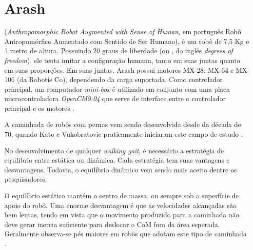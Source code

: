 \chapter{Arash}

(\textit{Anthropomorphic Robot Augmented with Sense of Human}, em português Robô Antropomórfico Aumentado com Sentido de Ser Humano), é um robô de 7,5 Kg e 1 metro de altura. Possuindo 20 graus de liberdade (ou , do inglês \textit{degrees of freedom}), ele tenta imitar a configuração humana, tanto em suas juntas quanto em suas proporções. Em suas juntas, Arash possui motores MX-28, MX-64 e MX-106 (da Robotis Co), dependendo da carga suportada. Como controlador principal, um computador \textit{mini-box} é utilizado em conjunto com uma placa microcontroladora \textit{OpenCM9.04} que serve de interface entre o controlador principal e os motores \cite{autdp2016}.

\noindent\makebox[\linewidth]{\rule{\paperwidth}{0.4pt}}

\begin{draft}
	A caminhada de robôs com pernas vem sendo desenvolvida desde da década de 70, quando Kato e Vukobratovic praticamente iniciaram este campo de estudo \cite{kajita2008}.
\end{draft}

\begin{draft}
	No desenvolvimento de qualquer \textit{walking gait}, é necessário a estratégia de equilíbrio entre estática ou dinâmica. Cada estratégia tem suas vantagens e desvantagens. Todavia, o equilíbrio dinâmico vem sendo mais aceito dentre os pesquisadores.
\end{draft}
	
\begin{draft}
	O equilíbrio estático mantém o centro de massa, ou  sempre sob a superfície de apoio do robô. Uma enorme desvantagem é que as velocidades alcançadas são bem lentas, tendo em vista que o movimento produzido para a caminhada não deve gerar inercia suficiente para deslocar o CoM fora da área esperada. Geralmente observa-se pés maiores em robôs que adotam este tipo de caminhada \cite{miller1994}.
\end{draft}

